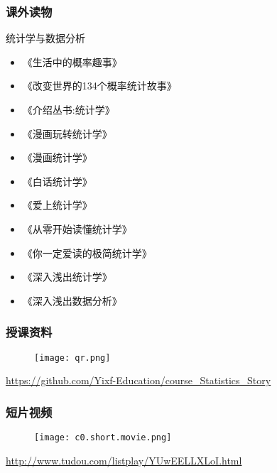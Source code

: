 \begin{frame}
  \frametitle{课外读物}
    \begin{block}{统计学与数据分析}
      \begin{multicols}{2}
      \begin{itemize}
         \item 《生活中的概率趣事》
         \item 《改变世界的134个概率统计故事》
         \item 《介绍丛书:统计学》
         \item 《漫画玩转统计学》
         \item 《漫画统计学》
         \item 《白话统计学》
         \item 《爱上统计学》
         \item 《从零开始读懂统计学》
         \item 《你一定爱读的极简统计学》
         \item 《深入浅出统计学》
         \item 《深入浅出数据分析》
        \end{itemize}
      \end{multicols}
    \end{block}
\end{frame}

\begin{frame}
  \frametitle{授课资料}
  \begin{figure}
    \centering
    \texttt{[image: qr.png]}
  \end{figure}
  \begin{center}
    \href{https://github.com/Yixf-Education/course_Statistics_Story}{https://github.com/Yixf-Education/course\_Statistics\_Story}
  \end{center}
\end{frame}

\begin{frame}
  \frametitle{短片视频}
  \begin{figure}
    \centering
    \texttt{[image: c0.short.movie.png]}
  \end{figure}
  \begin{center}
    \href{http://www.tudou.com/listplay/YUwEELLXLoI.html}{http://www.tudou.com/listplay/YUwEELLXLoI.html}
  \end{center}
\end{frame}


